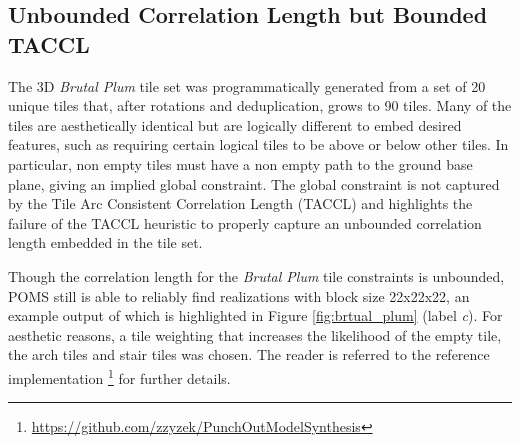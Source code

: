 \subsection{Unbounded Correlation Length but Bounded TACCL}

The 3D \textit{Brutal Plum} tile set was programmatically generated from a set of 20 unique tiles that, after rotations and deduplication,
grows to 90 tiles.
Many of the tiles are aesthetically identical but are logically different to embed desired features, such as requiring certain
logical tiles to be above or below other tiles.
In particular, non empty tiles must have a non empty path to the ground base plane, giving an implied global constraint.
The global constraint is not captured by the Tile Arc Consistent Correlation Length (TACCL) and highlights
the failure of the TACCL heuristic to properly capture an unbounded correlation length embedded in the tile set.

Though the correlation length for the \textit{Brutal Plum} tile constraints is unbounded, POMS still is able to reliably find realizations with
block size 22x22x22, an example output of which is highlighted in Figure \ref{fig:brtual_plum} (label \textit{c}).
For aesthetic reasons, a tile weighting that increases the likelihood of the empty tile, the arch tiles and
stair tiles was chosen.
The reader is referred to the reference implementation \footnote{ \label{poms-url} \url{https://github.com/zzyzek/PunchOutModelSynthesis} }
for further details.


